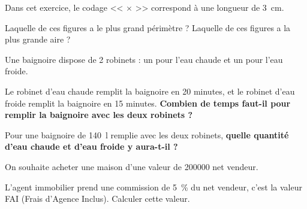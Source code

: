 \documentclass["../Cours.tex"]{subfiles}
\begin{document}
\begin{questions}
    Dans cet exercice, le codage << $\times$ >> correspond à une longueur de \qty{3}{\centi\metre}.

    \begin{center}
    \end{center}
    
    \question Laquelle de ces figures a le plus grand périmètre ?
    \question Laquelle de ces figures a la plus grande aire ? 

\clearpage

    Une baignoire dispose de 2 robinets : un pour l'eau chaude et un pour l'eau froide. 
    
    \question Le robinet d'eau chaude remplit la baignoire en 20 minutes, et le robinet d'eau froide remplit la baignoire en 15 minutes. \textbf{Combien de temps faut-il pour remplir la baignoire avec les deux robinets ?}

    \question Pour une baignoire de \qty{140}{\litre} remplie avec les deux robinets, \textbf{quelle quantité d'eau chaude et d'eau froide y aura-t-il ?}



    On souhaite acheter une maison d'une valeur de \qty{200000}{\EURO} net vendeur.

    \question L'agent immobilier prend une commission de \qty{5}{\percent} du net vendeur, c'est la valeur FAI (Frais d'Agence Inclus). Calculer cette valeur.


\end{questions}
\end{document}
